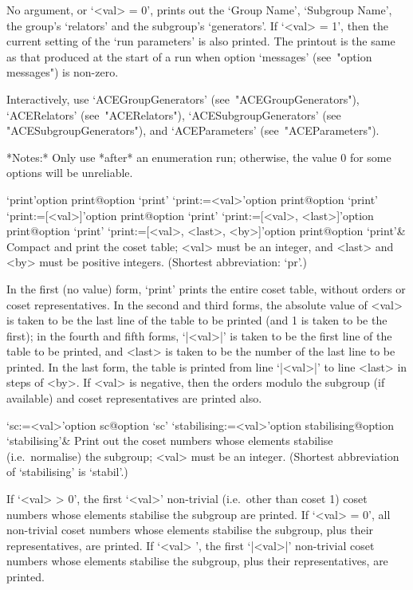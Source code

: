 No argument, or `<val> = 0', prints out the  `Group  Name',  `Subgroup
Name', the group's `relators'  and  the  subgroup's  `generators'.  If
`<val> = 1', then the current setting of the \lq{}run  parameters'  is
also printed. The printout is the same as that produced at  the  start
of a run when option `messages' (see~"option messages") is non-zero.

Interactively,  use  `ACEGroupGenerators'  (see~"ACEGroupGenerators"),
`ACERelators'   (see~"ACERelators"),   `ACESubgroupGenerators'    (see
"ACESubgroupGenerators"), and `ACEParameters' (see~"ACEParameters").

*Notes:*
Only use *after* an enumeration run; otherwise, the value 0  for  some
options will be unreliable.

\>`print'{option print}@{option `print'}
\>`print:=<val>'{option print}@{option `print'}
\>`print:=[<val>]'{option print}@{option `print'}
\>`print:=[<val>, <last>]'{option print}@{option `print'}
\>`print:=[<val>, <last>, <by>]'{option print}@{option `print'}&
Compact and print the coset table;  <val>  must  be  an  integer,  and
<last> and <by> must be positive integers.
(Shortest abbreviation: `pr'.)

In the first (no value) form, `print' prints the entire  coset  table,
without orders or coset  representatives.  In  the  second  and  third
forms, the absolute value of <val> is taken to be the last line of the
table to be printed (and 1 is taken to be the first);  in  the  fourth
and fifth forms, `|<val>|' is taken to be the first line of the  table
to be printed, and <last> is taken to be the number of the  last  line
to be printed. In the last  form,  the  table  is  printed  from  line
`|<val>|' to line <last> in steps of <by>. If <val> is negative,  then
the  orders   modulo   the   subgroup   (if   available)   and   coset
representatives are printed also.

\>`sc:=<val>'{option sc}@{option `sc'}
\>`stabilising:=<val>'{option stabilising}@{option `stabilising'}&
Print out the coset numbers whose elements stabilise  (i.e.~normalise)
the subgroup; <val> must be an integer.
(Shortest abbreviation of `stabilising' is `stabil'.)

If `<val> > 0', the first `<val>' non-trivial (i.e.~other  than  coset
1) coset numbers whose elements stabilise the subgroup are printed. If
`<val> = 0', all non-trivial coset numbers  whose  elements  stabilise
the subgroup, plus their representatives, are printed.  If  `<val>  ', the first  `|<val>|'  non-trivial  coset  numbers  whose  elements
stabilise the subgroup, plus their representatives, are printed.

